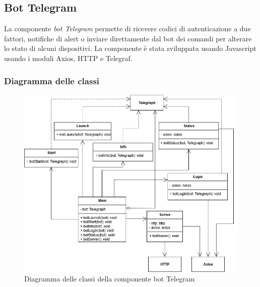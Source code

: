 \subsection{Bot Telegram}
	La componente \textit{bot Telegram} permette di ricevere codici di autenticazione a due fattori, notifiche di alert o inviare direttamente dal bot dei comandi per alterare lo stato di alcuni dispositivi.
	La componente è stata sviluppata usando Javascript usando i moduli Axios, HTTP e Telegraf.
	 
\subsubsection{Diagramma delle classi}%
	\begin{figure}[H]
		\centering
		\includegraphics[scale=0.600]{res/images/BOTTELEGRAM/ClassiTelegram.png}
		\caption{Diagramma delle classi della componente bot Telegram}
		\label{Diagramma 19}
	\end{figure}
